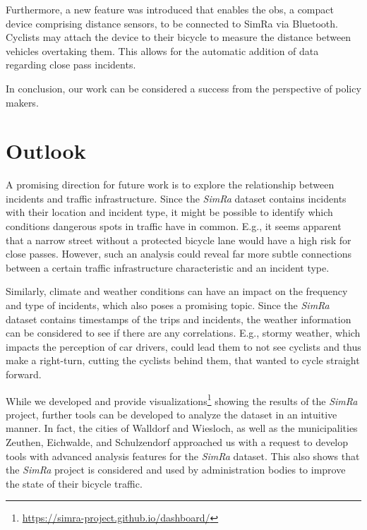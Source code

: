Furthermore, a new feature was introduced that enables the \ac{obs}, a compact device comprising distance sensors, to be connected to SimRa via Bluetooth.
Cyclists may attach the device to their bicycle to measure the distance between vehicles overtaking them. This allows for the automatic addition of data regarding close pass incidents.

In conclusion, our work can be considered a success from the perspective of policy makers.

\section*{Outlook}
\label{sec:outlook}
A promising direction for future work is to explore the relationship between incidents and traffic infrastructure.
Since the \textit{SimRa} dataset contains incidents with their location and incident type, it might be possible to identify which conditions dangerous spots in traffic have in common.
E.g., it seems apparent that a narrow street without a protected bicycle lane would have a high risk for close passes.
However, such an analysis could reveal far more subtle connections between a certain traffic infrastructure characteristic and an incident type.

Similarly, climate and weather conditions can have an impact on the frequency and type of incidents, which also poses a promising topic.
Since the \textit{SimRa} dataset contains timestamps of the trips and incidents, the weather information can be considered to see if there are any correlations.
E.g., stormy weather, which impacts the perception of car drivers, could lead them to not see cyclists and thus make a right-turn, cutting the cyclists behind them, that wanted to cycle straight forward.

While we developed and provide visualizations\footnote{\url{https://simra-project.github.io/dashboard/}} showing the results of the \textit{SimRa} project, further tools can be developed to analyze the dataset in an intuitive manner.
In fact, the cities of Walldorf and Wiesloch, as well as the municipalities Zeuthen, Eichwalde, and Schulzendorf approached us with a request to develop tools with advanced analysis features for the \textit{SimRa} dataset.
This also shows that the \textit{SimRa} project is considered and used by administration bodies to improve the state of their bicycle traffic.
 